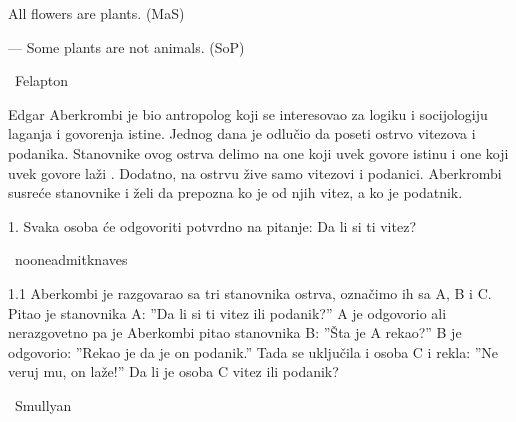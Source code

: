 \begin{isabellebody}
\begin{exercise}[subtitle=Silogizmi]
\begin{isamarkuptext}
All flowers are plants. (MaS)%
\end{isamarkuptext}\isamarkuptrue%
%
\begin{isamarkuptext}%
— Some plants are not animals. (SoP)%
\end{isamarkuptext}\isamarkuptrue%
\isamarkupfalse%
\ Felapton{\isacharcolon}{\kern0pt}\ %
\isadelimproof
%
\endisadelimproof
%
\isatagproof
%
\endisatagproof
{\isafoldproof}%
%
\isadelimproof
%
\endisadelimproof
%
\end{exercise}
%
\begin{exercise}[subtitle=Raymond M. Smullyan: Logical Labyrinths]
%
\begin{isamarkuptext}%
Edgar Aberkrombi je bio antropolog koji se interesovao za logiku i socijologiju
      laganja i govorenja istine. Jednog dana je odlučio da poseti ostrvo vitezova i podanika.
      Stanovnike ovog ostrva delimo na one koji uvek govore istinu  i
      one koji uvek govore laži . Dodatno, na ostrvu žive samo vitezovi i 
      podanici. Aberkrombi susreće stanovnike i želi da prepozna ko je od njih vitez, 
      a ko je podatnik.%
\end{isamarkuptext}\isamarkuptrue%
%
\begin{isamarkuptext}%
1. Svaka osoba će odgovoriti potvrdno na pitanje: Da li si ti vitez?%
\end{isamarkuptext}\isamarkuptrue%
\isamarkupfalse%
\ no{\isacharunderscore}{\kern0pt}one{\isacharunderscore}{\kern0pt}admit{\isacharunderscore}{\kern0pt}knaves{\isacharcolon}{\kern0pt}\ %
\isadelimproof
%
\endisadelimproof
%
\isatagproof
%
\endisatagproof
{\isafoldproof}%
%
\isadelimproof
%
\endisadelimproof
%
\begin{isamarkuptext}%
1.1 Aberkombi je razgovarao sa tri stanovnika ostrva, označimo ih sa A, B i C. 
          Pitao je stanovnika A: ”Da li si ti vitez ili podanik?” 
          A je odgovorio ali nerazgovetno 
          pa je Aberkombi pitao stanovnika B: ”Šta je A rekao?” 
          B je odgovorio: ”Rekao je da je on podanik.” 
          Tada se uključila i osoba C i rekla: ”Ne veruj mu, on laže!” 
          Da li je osoba C vitez ili podanik?%
\end{isamarkuptext}\isamarkuptrue%
\isamarkupfalse%
\ Smullyan{\isacharunderscore}{\kern0pt}{}{\isacharunderscore}{\kern0pt}{}{\isacharcolon}{\kern0pt}%
\isadelimproof
%
\endisadelimproof
%
\isatagproof
%
\endisatagproof
{\isafoldproof}%
%
\isadelimproof
%
\endisadelimproof

\end{exercise}
\end{isabellebody}
